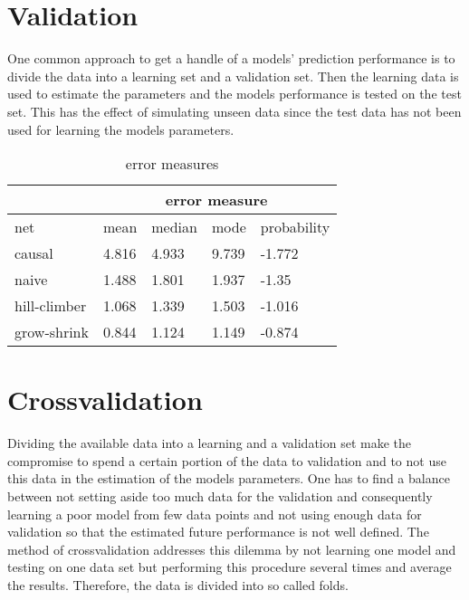 \section{Validation}
One common approach to get a handle of a models' prediction performance is to divide the data into a learning set and a validation set. Then the learning data is used to estimate the parameters and the models performance is tested on the test set. This has the effect of simulating unseen data since the test data has not been used for learning the models parameters.

\begin{table}[h]
\centering
\begin{tabular}{ l l l l l  }
 \hline
  & \multicolumn{4}{c}{error measure} \\
 \hline
 net & mean & median & mode & probability\\
 \hline
 causal   & 4.816    & 4.933  & 9.739   &-1.772\\
 naive   & 1.488      & 1.801 & 1.937  &-1.35\\
 hill-climber   & 1.068      & 1.339 & 1.503  &-1.016\\
 grow-shrink   & 0.844     & 1.124  & 1.149 &-0.874\\
\end{tabular}
\caption[Validation Error]{error measures}
\label{tab:2}
\end{table}

\section{Crossvalidation}
Dividing the available data into a learning and a validation set make the compromise to spend a certain portion of the data to validation and to not use this data in the estimation of the models parameters. One has to find a balance between not setting aside too much data for the validation and consequently learning a poor model from few data points and not using enough data for validation so that the estimated future performance is not well defined. The method of crossvalidation addresses this dilemma by not learning one model and testing on one data set but performing this procedure several times and average the results. Therefore, the data is divided into so called folds.

